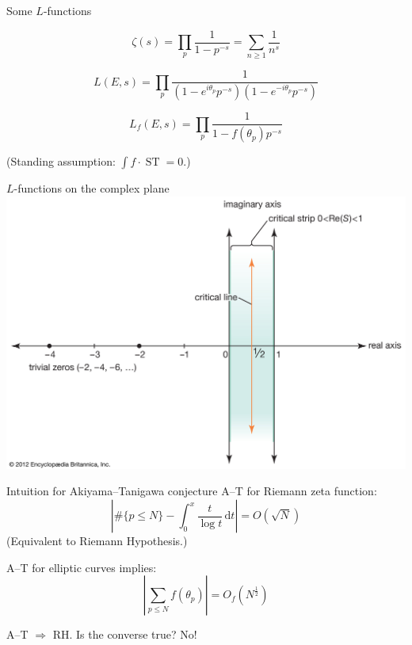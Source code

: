 \documentclass{beamer}
\DeclareMathOperator{\ST}{ST}
\newcommand{\dd}{\mathrm{d}}
\begin{document}
\begin{frame}{Some $L$-functions}
\begin{definition}
\[
	\zeta(s) = \prod_p \frac{1}{1-p^{-s}} = \sum_{n\geqslant 1} \frac{1}{n^s}
\]
\end{definition}
\pause

\begin{definition}
\[
	L(E,s) = \prod_p \frac{1}{(1-e^{i\theta_p}p^{-s})(1-e^{-i\theta_p}p^{-s})}
\]
\end{definition}
\pause

\begin{definition}
\[
	L_f(E,s) = \prod_p \frac{1}{1-f(\theta_p)p^{-s}}
\]
\end{definition}
\pause

(Standing assumption: $\int f\cdot \ST = 0$.)
\end{frame}


\begin{frame}{$L$-functions on the complex plane}
\includegraphics[width=\textwidth]{critical_strip}
\end{frame}

\begin{frame}{Intuition for Akiyama--Tanigawa conjecture}
A--T for Riemann zeta function: 
\[
	\left| \# \{p\leqslant N\} - \int_0^x \frac{t}{\log t}\, \dd t\right| = O(\sqrt N)
\]
\pause
(Equivalent to Riemann Hypothesis.)
\pause

A--T for elliptic curves implies:
\[
	\left| \sum_{p\leqslant N} f(\theta_p) \right| = O_f(N^{\frac 1 2})
\]
\pause

A--T $\Rightarrow$ RH.\pause{} 
Is the converse true?\pause{} 
No!
\end{frame}
\end{document}
